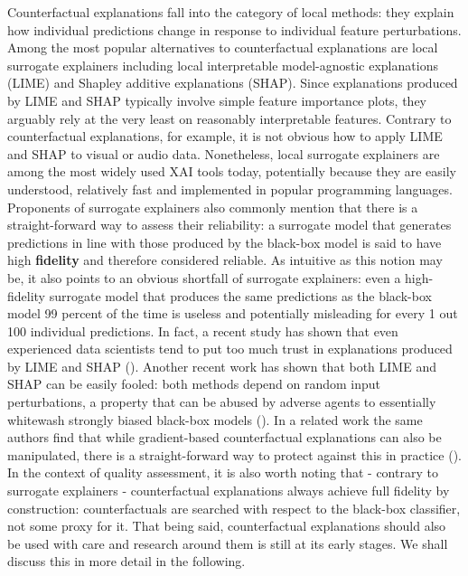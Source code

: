 \documentclass[
  letterpaper,
  DIV=11,
  numbers=noendperiod]{scrartcl}
\begin{document}
Counterfactual explanations fall into the category of local methods:
they explain how individual predictions change in response to individual
feature perturbations. Among the most popular alternatives to
counterfactual explanations are local surrogate explainers including
local interpretable model-agnostic explanations (LIME) and Shapley
additive explanations (SHAP). Since explanations produced by LIME and
SHAP typically involve simple feature importance plots, they arguably
rely at the very least on reasonably interpretable features. Contrary to
counterfactual explanations, for example, it is not obvious how to apply
LIME and SHAP to visual or audio data. Nonetheless, local surrogate
explainers are among the most widely used XAI tools today, potentially
because they are easily understood, relatively fast and implemented in
popular programming languages. Proponents of surrogate explainers also
commonly mention that there is a straight-forward way to assess their
reliability: a surrogate model that generates predictions in line with
those produced by the black-box model is said to have high
\textbf{fidelity} and therefore considered reliable. As intuitive as
this notion may be, it also points to an obvious shortfall of surrogate
explainers: even a high-fidelity surrogate model that produces the same
predictions as the black-box model 99 percent of the time is useless and
potentially misleading for every 1 out 100 individual predictions. In
fact, a recent study has shown that even experienced data scientists
tend to put too much trust in explanations produced by LIME and SHAP
(\cite{kaur2020interpreting}). Another recent work has shown that both
LIME and SHAP can be easily fooled: both methods depend on random input
perturbations, a property that can be abused by adverse agents to
essentially whitewash strongly biased black-box models
(\cite{slack2020fooling}). In a related work the same authors find that
while gradient-based counterfactual explanations can also be
manipulated, there is a straight-forward way to protect against this in
practice (\cite{slack2021counterfactual}). In the context of quality
assessment, it is also worth noting that - contrary to surrogate
explainers - counterfactual explanations always achieve full fidelity by
construction: counterfactuals are searched with respect to the black-box
classifier, not some proxy for it. That being said, counterfactual
explanations should also be used with care and research around them is
still at its early stages. We shall discuss this in more detail in the
following.
\end{document}
